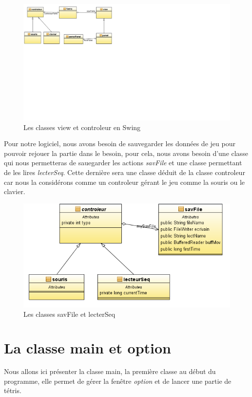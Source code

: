 \documentclass{article}           %
\begin{document}
\begin{figure}[]
   \caption{Les classes view et controleur en Swing }
   \includegraphics{diagram3.png}
\end{figure}

\newpage
Pour notre logiciel, nous avons besoin de sauvegarder les données de jeu pour pouvoir rejouer la partie dans le besoin, pour cela, nous avons besoin d'une classe qui nous permetteras de sauegarder les actions \emph{savFile} et une classe permettant de les lires \emph{lecterSeq}. Cette dernière sera une classe déduit de la classe controleur car nous la considérons comme un controleur gérant le jeu comme la souris ou le clavier.

\begin{figure}[]
   \caption{Les classes savFile et lecterSeq}
   \includegraphics[width=15cm]{diagram4.png}
\end{figure}

\newpage
\section{La classe main et option}
Nous allons ici présenter la classe main, la première classe au début du programme, elle permet de gérer la fenêtre \emph{option} et de lancer une partie de tétris.
\end{document}
